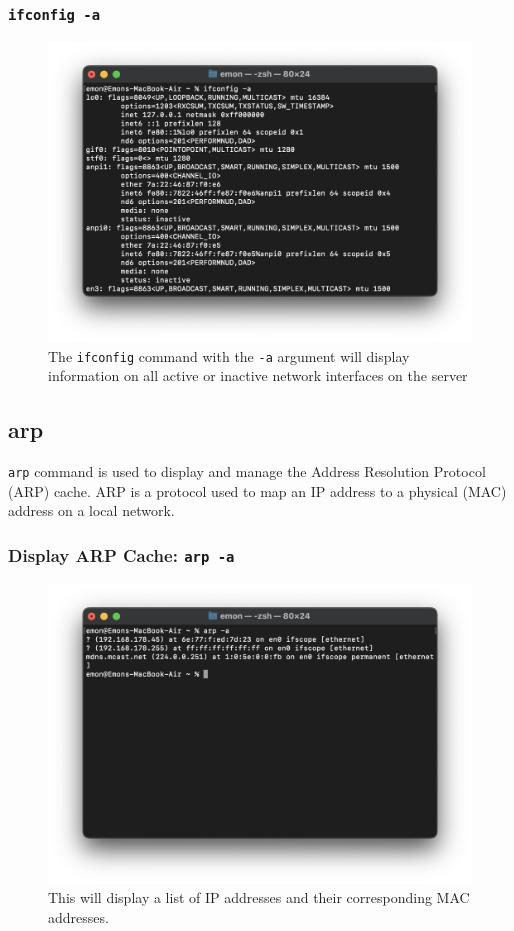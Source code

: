 \documentclass[11pt]{article}
\newcommand{\terminal}[1]{\texttt{\color{terminalcolor}#1}}
\begin{document}
\subsubsection{\terminal{ifconfig -a}}
\begin{figure}[!h]
    \centering
    \includegraphics[width=\textwidth]{ifconfig2.png}
    \caption{The \terminal{ifconfig} command with the \terminal{-a} argument will display information on all active or inactive network interfaces on the server}
\end{figure}

\newpage

\subsection{arp}
\terminal{arp} command is used to display and manage the Address Resolution Protocol (ARP) cache. ARP is a protocol used to map an IP address to a physical (MAC) address on a local network.
\subsubsection{Display ARP Cache: \terminal{arp -a}}
\begin{figure}[!h]
    \centering
    \includegraphics[width=\textwidth]{arp1.png}
    \caption{This will display a list of IP addresses and their corresponding MAC addresses.}
\end{figure}
\end{document}
